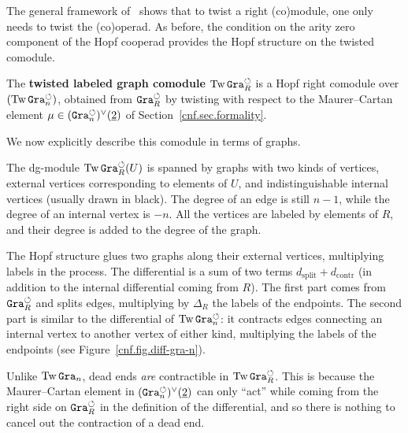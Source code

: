 The general framework of~\cite[Appendix C]{Willwacher2016} shows that to twist a right (co)module, one only needs to twist the (co)operad.
As before, the condition on the arity zero component of the Hopf cooperad provides the Hopf structure on the twisted comodule.

\begin{definition}
  The \textbf{twisted labeled graph comodule} $\operatorname{Tw}\mathtt{Gra}^{\circlearrowleft}_{R}$ is a Hopf right comodule over $(\operatorname{Tw}\mathtt{Gra}^{\circlearrowleft}_{n})$, obtained from $\mathtt{Gra}^{\circlearrowleft}_{R}$ by twisting with respect to the Maurer--Cartan element $\mu \in (\mathtt{Gra}^{\circlearrowleft}_{n})^{\vee}(\underline{2})$ of Section~\ref{cnf.sec.formality}.
\end{definition}

We now explicitly describe this comodule in terms of graphs.

The dg-module $\operatorname{Tw} \mathtt{Gra}^{\circlearrowleft}_{R} (U)$ is spanned by graphs with two kinds of vertices, external vertices corresponding to elements of $U$, and indistinguishable internal vertices (usually drawn in black).
The degree of an edge is still $n-1$, while the degree of an internal vertex is $-n$.
All the vertices are labeled by elements of $R$, and their degree is added to the degree of the graph.

The Hopf structure glues two graphs along their external vertices, multiplying labels in the process.
The differential is a sum of two terms $d_{\mathrm{split}} + d_{\mathrm{contr}}$ (in addition to the internal differential coming from $R$).
The first part comes from $\mathtt{Gra}^{\circlearrowleft}_{R}$ and splits edges, multiplying by $\Delta_{R}$ the labels of the endpoints.
The second part is similar to the differential of $\operatorname{Tw} \mathtt{Gra}^{\circlearrowleft}_{n}$: it contracts edges connecting an internal vertex to another vertex of either kind, multiplying the labels of the endpoints (see Figure~\ref{cnf.fig.diff-gra-n}).

\begin{remark}
  \label{cnf.rmk.tw-gra-r-dead-end}
  Unlike $\operatorname{Tw}\mathtt{Gra}_{n}$, dead ends \emph{are} contractible in $\operatorname{Tw}\mathtt{Gra}^{\circlearrowleft}_{R}$.
  This is because the Maurer--Cartan element in $(\mathtt{Gra}^{\circlearrowleft}_{n})^{\vee}(\underline{2})$ can only ``act'' while coming from the right side on $\mathtt{Gra}^{\circlearrowleft}_{R}$ in the definition of the differential, and so there is nothing to cancel out the contraction of a dead end.
\end{remark}

